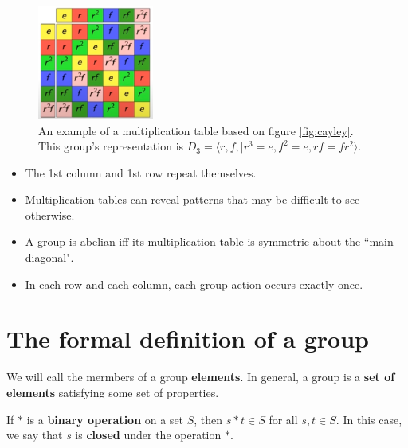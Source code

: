 \documentclass[twocolumn]{article}
\begin{document}
\begin{figure}[h]
    \centering
    \includegraphics[width = 1.5in]{figure/multi_table2.png}
    \caption{An example of a multiplication table based on figure \ref{fig:cayley}. This group's representation is $D_3 = \langle r,f, \mid r^3 = e, f^2 = e, rf = fr^2 \rangle$.}
    \label{fig:multi2}
\end{figure}

\begin{tcolorbox}[colback=blue!5!white,colframe=blue!15!white,coltitle=black, boxrule=0pt,title=Notes on multiplication tables, drop shadow southeast, enhanced]
    \begin{itemize}
        \item The 1st column and 1st row repeat themselves. 
        \item Multiplication tables can reveal patterns that may be difficult to see otherwise.
        \item A group is abelian iff its multiplication table is symmetric about the ``main diagonal".
        \item In each row and each column, each group action occurs exactly once.
    \end{itemize}
\end{tcolorbox}

\section{The formal definition of a group}

We will call the mermbers of a group \textbf{elements}. In general, a group is a \textbf{set of elements} satisfying some set of properties.

\begin{tcolorbox}[colback=blue!5!white,colframe=blue!15!white,coltitle=black, boxrule=0pt,title=Definition of a binary operation, drop shadow southeast, enhanced]
    If $*$ is a \textbf{binary operation} on a set $S$, then $s * t \in S$ for all $s ,  t \in S$. In this case, we say that $s$ is \textbf{closed} under the operation $*$.
\end{tcolorbox}
\end{document}
